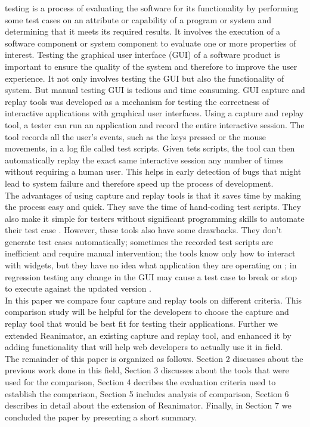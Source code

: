\documentclass[12pt,journal]{IEEEtran}
\begin{document}
 testing is a process of  evaluating the software for its functionality by performing some test cases on an attribute or capability of a program or system and determining that it meets its required results. It involves the execution of a software component or system component to evaluate one or more properties of interest. Testing the graphical user interface (GUI) of a software product is important to ensure the quality of the system and therefore to improve the user experience\cite{Nedyalkova:2013:OSC:2494444.2494464}. It not only involves testing the GUI but also the functionality of system. But manual testing GUI is tedious and time consuming. GUI capture and replay tools was  developed as a mechanism for testing the correctness of interactive applications with graphical user interfaces. Using a capture and replay tool, a tester can run an application and record the entire interactive session. The tool records all the user's events, such as the keys pressed or the mouse movements, in a log file called test scripts. Given tets scripts, the tool can then automatically replay the exact same interactive session any number of times without requiring a human user. This helps in early detection of bugs that might lead to system failure and therefore speed up the process of development.\\
The advantages of using capture and replay tools is that it saves time by making the process easy and quick. They save the time of hand-coding test scripts. They also make it simple for testers without significant programming skills to automate their test case \cite{Memom}. However, these tools also have some drawbacks. They don’t generate test cases automatically; sometimes the recorded test scripts are inefficient and require manual intervention; the tools know only how to interact with widgets, but they have no idea what application they are operating on \cite{Silverstein}; in regression testing any change in the GUI may cause a test case to break or stop to execute against the updated version \cite{Memom}.\\
In this paper we compare four capture and replay tools on different criteria. This comparison study will be helpful for the developers to choose the capture and replay tool that would be best fit for testing their applications. Further we extended Reanimator, an existing capture and replay tool, and enhanced it by adding functionality that will help web developers to actually use it in field.\\
 The remainder of this paper is organized as follows. Section 2 discusses about the previous work done in this field, Section 3 discusses about the tools that were used for the comparison, Section 4 decribes the evaluation criteria used to establish the comparison, Section 5 includes analysis of comparison, Section 6 describes in detail about the extension of Reanimator. Finally, in Section 7 we concluded the paper by presenting a short summary. 
 
\end{document}
